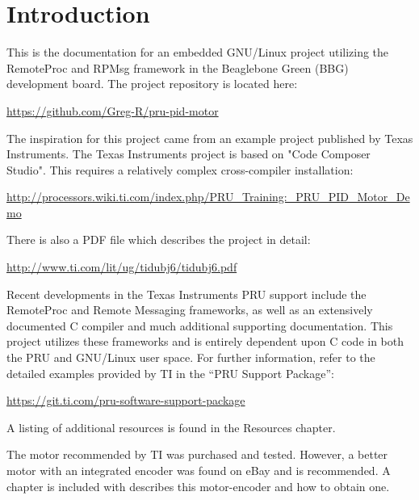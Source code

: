 %
%
%

\chapter{Introduction}

This is the documentation for an embedded GNU/Linux project utilizing the RemoteProc and RPMsg framework in the Beaglebone Green (BBG) development board.  The project repository is located here:

\url{https://github.com/Greg-R/pru-pid-motor}

The inspiration for this project came from an example project published by Texas Instruments.  The Texas Instruments project is based on "Code Composer Studio".  This
requires a relatively complex cross-compiler installation:

\url{http://processors.wiki.ti.com/index.php/PRU_Training:_PRU_PID_Motor_Demo}

There is also a PDF file which describes the project in detail:

\url{http://www.ti.com/lit/ug/tidubj6/tidubj6.pdf}

Recent developments in the Texas Instruments PRU support include the RemoteProc and Remote Messaging frameworks, as well as an extensively documented C compiler and much additional supporting documentation.  This project utilizes these frameworks and is entirely dependent upon C code in both the PRU and GNU/Linux user space.  For further information, refer to the detailed examples provided by TI in the ``PRU Support Package'':

\url{https://git.ti.com/pru-software-support-package}

A listing of additional resources is found in the Resources chapter.

The motor recommended by TI was purchased and tested.  However, a better motor with an integrated encoder was found on eBay and is recommended.  A chapter is included with describes this motor-encoder and how to obtain one.

